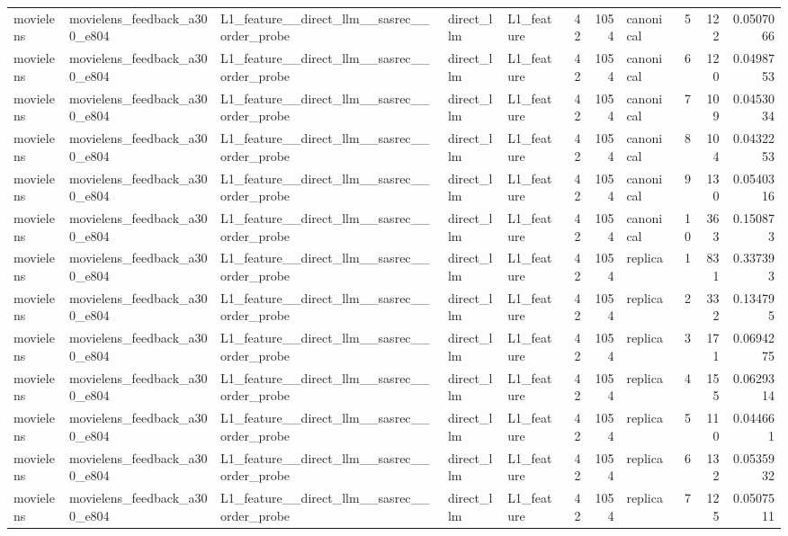\begin{table}[htbp!]
\begin{tabular}{lllllrrlrrr}
movielens & movielens\_feedback\_a300\_e804 & L1\_feature\_\_direct\_llm\_\_sasrec\_\_order\_probe & direct\_llm & L1\_feature & 42 & 1054 & canonical & 5 & 122 & 0.0507066 \\
movielens & movielens\_feedback\_a300\_e804 & L1\_feature\_\_direct\_llm\_\_sasrec\_\_order\_probe & direct\_llm & L1\_feature & 42 & 1054 & canonical & 6 & 120 & 0.0498753 \\
movielens & movielens\_feedback\_a300\_e804 & L1\_feature\_\_direct\_llm\_\_sasrec\_\_order\_probe & direct\_llm & L1\_feature & 42 & 1054 & canonical & 7 & 109 & 0.0453034 \\
movielens & movielens\_feedback\_a300\_e804 & L1\_feature\_\_direct\_llm\_\_sasrec\_\_order\_probe & direct\_llm & L1\_feature & 42 & 1054 & canonical & 8 & 104 & 0.0432253 \\
movielens & movielens\_feedback\_a300\_e804 & L1\_feature\_\_direct\_llm\_\_sasrec\_\_order\_probe & direct\_llm & L1\_feature & 42 & 1054 & canonical & 9 & 130 & 0.0540316 \\
movielens & movielens\_feedback\_a300\_e804 & L1\_feature\_\_direct\_llm\_\_sasrec\_\_order\_probe & direct\_llm & L1\_feature & 42 & 1054 & canonical & 10 & 363 & 0.150873 \\
movielens & movielens\_feedback\_a300\_e804 & L1\_feature\_\_direct\_llm\_\_sasrec\_\_order\_probe & direct\_llm & L1\_feature & 42 & 1054 & replica & 1 & 831 & 0.337393 \\
movielens & movielens\_feedback\_a300\_e804 & L1\_feature\_\_direct\_llm\_\_sasrec\_\_order\_probe & direct\_llm & L1\_feature & 42 & 1054 & replica & 2 & 332 & 0.134795 \\
movielens & movielens\_feedback\_a300\_e804 & L1\_feature\_\_direct\_llm\_\_sasrec\_\_order\_probe & direct\_llm & L1\_feature & 42 & 1054 & replica & 3 & 171 & 0.0694275 \\
movielens & movielens\_feedback\_a300\_e804 & L1\_feature\_\_direct\_llm\_\_sasrec\_\_order\_probe & direct\_llm & L1\_feature & 42 & 1054 & replica & 4 & 155 & 0.0629314 \\
movielens & movielens\_feedback\_a300\_e804 & L1\_feature\_\_direct\_llm\_\_sasrec\_\_order\_probe & direct\_llm & L1\_feature & 42 & 1054 & replica & 5 & 110 & 0.044661 \\
movielens & movielens\_feedback\_a300\_e804 & L1\_feature\_\_direct\_llm\_\_sasrec\_\_order\_probe & direct\_llm & L1\_feature & 42 & 1054 & replica & 6 & 132 & 0.0535932 \\
movielens & movielens\_feedback\_a300\_e804 & L1\_feature\_\_direct\_llm\_\_sasrec\_\_order\_probe & direct\_llm & L1\_feature & 42 & 1054 & replica & 7 & 125 & 0.0507511 \\

\end{tabular}
\end{table}
